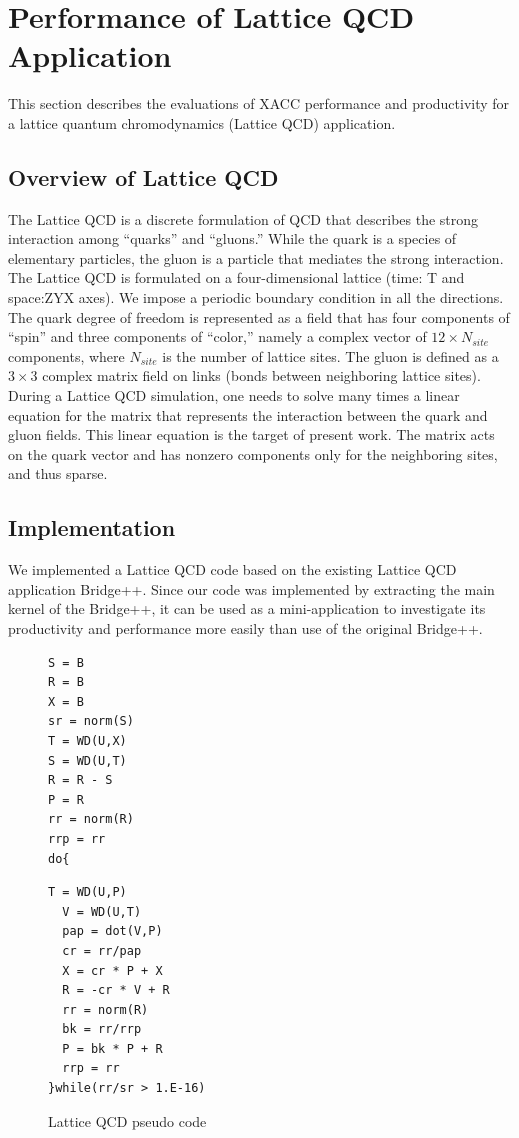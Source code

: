 \section{Performance of Lattice QCD Application}

This section describes the evaluations of XACC performance and productivity for a lattice quantum chromodynamics (Lattice QCD) application.

\subsection{Overview of Lattice QCD}
The Lattice QCD is a discrete formulation of QCD that describes the strong interaction among ``quarks'' and ``gluons.''
While the quark is a species of elementary particles, the gluon is a particle that mediates the strong interaction.
The Lattice QCD is formulated on a four-dimensional lattice (time: T and space:ZYX axes).
We impose a periodic boundary condition in all the directions.
The quark degree of freedom is represented as a field that has four components of ``spin'' and three components of ``color,''
namely a complex vector of $12 \times N_{site}$ components,
where $N_{site}$ is the number of lattice sites.
The gluon is defined as a $3\times 3$ complex matrix field on links (bonds between neighboring lattice sites).
During a Lattice QCD simulation,
one needs to solve many times a linear equation for the matrix that represents the interaction between the quark and gluon fields.
This linear equation is the target of present work.
The matrix acts on the quark vector and has nonzero components only for the neighboring sites, and thus sparse.

\subsection{Implementation}
We implemented a Lattice QCD code based on the existing Lattice QCD application Bridge++\cite{bridge++}.
Since our code was implemented by extracting the main kernel of the Bridge++,
it can be used as a mini-application to investigate its productivity and performance more easily than
use of the original Bridge++.

\begin{figure}[h]
\centering
\begin{minipage}{0.45\hsize}
\begin{lstlisting}
S = B
R = B
X = B
sr = norm(S)
T = WD(U,X)
S = WD(U,T)
R = R - S
P = R
rr = norm(R)
rrp = rr
do{
\end{lstlisting}
\end{minipage} \hspace{0.5cm}
\begin{minipage}{0.45\hsize}
\begin{lstlisting}[firstnumber=10]
  T = WD(U,P)
  V = WD(U,T)
  pap = dot(V,P)
  cr = rr/pap
  X = cr * P + X
  R = -cr * V + R
  rr = norm(R)
  bk = rr/rrp
  P = bk * P + R
  rrp = rr
}while(rr/sr > 1.E-16)
\end{lstlisting}
\end{minipage}
\caption{Lattice QCD pseudo code}\label{fig:pseudo}
\end{figure}

